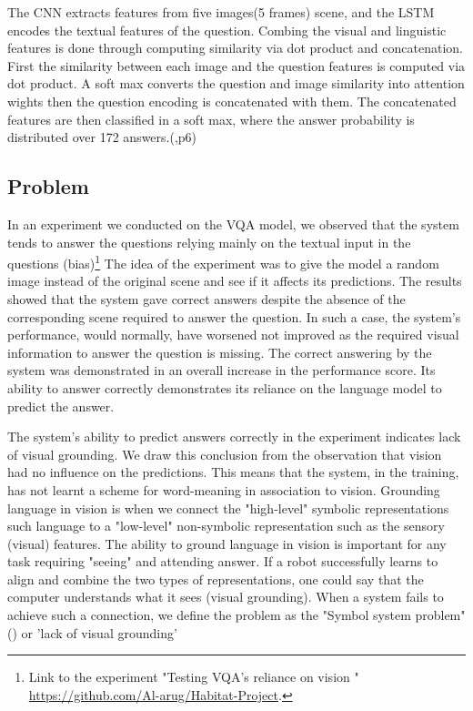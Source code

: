 The CNN extracts features from five images(5 frames) scene, and the LSTM encodes the textual features of the question. Combing the visual and linguistic features is done through computing similarity via dot product and concatenation. First the similarity between each image and the question features is computed via dot product. A soft max converts the question and image similarity into attention wights then the question encoding is concatenated with them. The concatenated features are then classified in a soft max, where the answer probability is distributed over 172 answers.(\cite{embodiedqa},p6)



\subsection{Problem}

In an experiment we conducted on the VQA model, we observed that the system tends to answer the questions relying mainly on the textual input in the questions (bias)\footnote{ Link to the experiment "Testing VQA's reliance on vision "  \url{https://github.com/Al-arug/Habitat-Project}.} The idea of the experiment was to give the model a random image instead of the original scene and see if it affects its predictions. The results showed that the system gave correct answers despite the absence of the corresponding scene required to answer the question. In such a case, the system's performance, would normally, have worsened not improved as the required visual information to answer the question is missing. The correct answering by the system was demonstrated in an overall increase in the performance score. Its ability to answer correctly demonstrates its reliance on the language model to predict the answer. 

The system's ability to predict answers correctly in the experiment indicates lack of visual grounding. We draw this conclusion from the observation that vision had no influence on the predictions. This means that the system, in the training, has not learnt a scheme for word-meaning in association to vision. Grounding language in vision is when we connect the "high-level" symbolic representations such language to a "low-level" non-symbolic representation such as the sensory (visual) features. The ability to ground language in vision is important for any task requiring "seeing" and attending answer. If a robot successfully learns to align and combine the two types of representations, one could say that the computer understands what it sees (visual grounding). When a system fails to achieve such a connection, we define the problem as the  "Symbol system problem"(\cite{harnad1990symbol}) or 'lack of visual grounding' 


